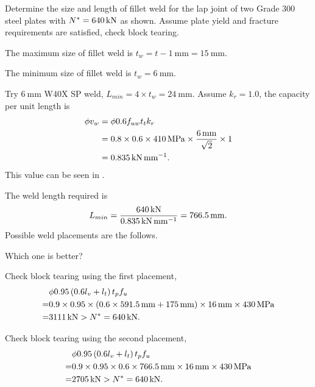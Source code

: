 \begin{exmp} Determine the size and length of fillet weld for the lap joint of two Grade 300 steel plates with $N^*=\SI{640}{\kilo\newton}$ as shown. Assume plate yield and fracture requirements are satisfied, check block tearing.
\begin{figure}[H]

\end{figure}
\end{exmp}
\begin{solution}
The maximum size of fillet weld is $t_w=t-\SI{1}{\mm}=\SI{15}{\mm}$.

The minimum size of fillet weld is $t_w=\SI{6}{\mm}$.

Try $\SI{6}{\mm}$ W40X SP weld, $L_{min}=4\times{}t_w=\SI{24}{\mm}$. Assume $k_r=1.0$, the capacity per unit length is
\begin{align*}
\phi{}v_w&=\phi{}0.6f_{uw}t_tk_r\\
&=0.8\times0.6\times\SI{410}{\mega\pascal}\times\dfrac{\SI{6}{\milli\meter}}{\sqrt{2}}\times1\\
&=\SI{0.835}{\kilo\newton\per\milli\meter}.
\end{align*}
This value can be seen in .

The weld length required is
\begin{gather*}
L_{min}=\dfrac{\SI{640}{\kilo\newton}}{\SI{0.835}{\kilo\newton\per\milli\meter}}=\SI{766.5}{\milli\meter}.
\end{gather*}
Possible weld placements are the follows.
\begin{figure}[H]
\centering

\end{figure}
Which one is better?

Check block tearing using the first placement,
\begin{align*}
&\phi0.95\left(0.6l_{v}+l_{t}\right)t_pf_u\\=&0.9\times0.95\times\left(0.6\times\SI{591.5}{\milli\meter}+\SI{175}{\milli\meter}\right)\times\SI{16}{\milli\meter}\times\SI{430}{\mega\pascal}
\\=&\SI{3111}{\kilo\newton}>N^*=\SI{640}{\kilo\newton}.
\end{align*}

Check block tearing using the second placement,
\begin{align*}
&\phi0.95\left(0.6l_{v}+l_{t}\right)t_pf_u\\=&0.9\times0.95\times0.6\times\SI{766.5}{\milli\meter}\times\SI{16}{\milli\meter}\times\SI{430}{\mega\pascal}
\\=&\SI{2705}{\kilo\newton}>N^*=\SI{640}{\kilo\newton}.
\end{align*}
\end{solution}
